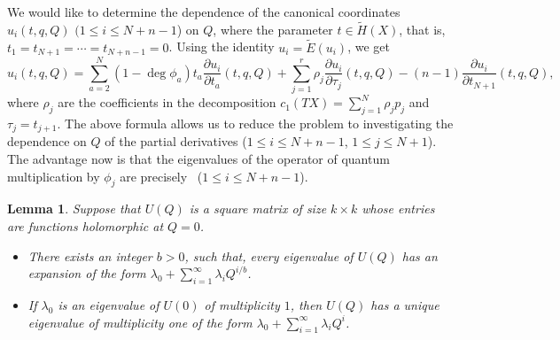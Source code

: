 \documentclass[pdftex]{sigma}
\numberwithin{equation}{section}
\newtheorem{Lemma}[Theorem]{Lemma}
\newcommand{\op}{\operatorname}
\begin{document}
We would like to determine the dependence of the canonical coordinates $u_i(t,q,Q)$ $(1\leq i\leq N+n-1$) on $Q$, where the parameter $t\in \widetilde{H}(X)$, that is, $t_1=t_{N+1}=\cdots= t_{N+n-1}=0$. Using the identity $u_i=\widetilde{E}(u_i)$, we get
\[%
u_i(t,q,Q)=
\sum_{a=2}^N (1-\op{deg}\phi_a)t_a
\frac{\partial u_i}{\partial t_a}(t,q,Q)+
\sum_{j=1}^r \rho_j
\frac{\partial u_i}{\partial \tau_j}(t,q,Q)-
(n-1)\frac{\partial u_i}{\partial t_{N+1}}(t,q,Q),
\]
where $\rho_j$ are the coefficients in the decomposition $c_1(TX)=\sum_{j=1}^N \rho_j p_j$ and $\tau_j=t_{j+1}$.
The above formula allows us to reduce the problem to investigating the dependence on $Q$ of the partial derivatives  ($1\leq i\leq N+n-1$, $1\leq j\leq N+1$). The advantage now is that the eigenvalues of the operator  of quantum multiplication by $\phi_j$ are precisely~ ($1\leq i\leq N+n-1$).
\begin{Lemma}\label{le:eig_Q}
Suppose that $U(Q)$ is a square matrix of size $k\times k$ whose entries are functions holomorphic at $Q=0$.
\begin{itemize}\itemsep=0pt
\item[$(a)$] There exists an integer $b>0$, such that, every eigenvalue of
$U(Q)$ has an expansion of the form $\lambda_0+\sum_{i=1}^\infty \lambda_i Q^{i/b}$.
\item[$(b)$] If $\lambda_0$ is an eigenvalue of $U(0)$ of multiplicity $1$, then $U(Q)$ has a unique eigenvalue of multiplicity one of the form $\lambda_0+\sum_{i=1}^\infty \lambda_i Q^i$.
 \end{itemize}
\end{Lemma}
\end{document}
